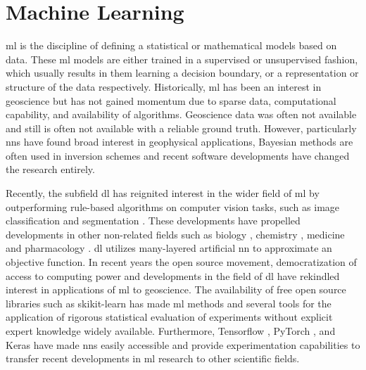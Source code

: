 \section{Machine Learning}
\acf{ml} is the discipline of defining a statistical or mathematical models based on data. These \ac{ml} models are either trained in a supervised or unsupervised fashion, which usually results in them learning a decision boundary, or a representation or structure of the data respectively. Historically, \ac{ml} has been an interest in geoscience but has not gained momentum due to sparse data, computational capability, and availability of algorithms. Geoscience data was often not available and still is often not available with a reliable ground truth. However, particularly \acp{nn} have found broad interest in geophysical applications, Bayesian methods are often used in inversion schemes and recent software developments have changed the research entirely.

Recently, the subfield \ac{dl} has reignited interest in the wider field of \ac{ml} by outperforming rule-based algorithms on computer vision tasks, such as image classification and segmentation \citep{Bishop2016-mj}. These developments have propelled developments in other non-related fields such as biology \citep{Ching2018-hg}, chemistry \citep{Schutt2017-sh}, medicine \citep{Shen2017-nt} and pharmacology \citep{Kadurin2017-oq}. \ac{dl} utilizes many-layered artificial \ac{nn} to approximate an objective function. In recent years the open source movement, democratization of access to computing power and developments in the field of \ac{dl} have rekindled interest in applications of \ac{ml} to geoscience. The availability of free open source libraries such as skikit-learn \citep{scikit-learn} has made \ac{ml} methods and several tools for the application of rigorous statistical evaluation of experiments without explicit expert knowledge widely available. Furthermore, Tensorflow \citep{tensorflow}, PyTorch \citep{pytorch}, and Keras \citep{keras} have made \acp{nn} easily accessible and provide experimentation capabilities to transfer recent developments in \ac{ml} research to other scientific fields. 


